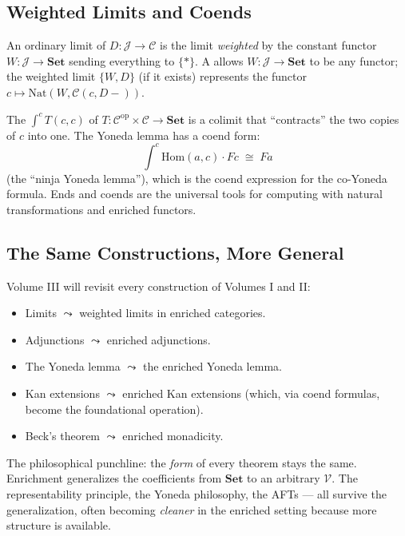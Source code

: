 \subsection{Weighted Limits and Coends}

An ordinary limit of $D: \mathcal{J} \to \mathcal{C}$ is the limit
\emph{weighted} by the constant functor $W: \mathcal{J} \to \mathbf{Set}$
sending everything to $\{*\}$. A  allows $W:
\mathcal{J} \to \mathbf{Set}$ to be any functor; the weighted limit
$\{W, D\}$ (if it exists) represents the functor
$c \mapsto \mathrm{Nat}(W, \mathcal{C}(c, D-))$.

The  $\int^c T(c,c)$ of $T: \mathcal{C}^{\mathrm{op}} \times
\mathcal{C} \to \mathbf{Set}$ is a colimit that ``contracts'' the two
copies of $c$ into one. The Yoneda lemma has a coend form:
\[
  \int^c \mathrm{Hom}(a, c) \cdot Fc \;\cong\; Fa
\]
(the ``ninja Yoneda lemma''), which is the coend expression for the
co-Yoneda formula. Ends and coends are the universal tools for computing
with natural transformations and enriched functors.

\subsection{The Same Constructions, More General}

Volume III will revisit every construction of Volumes I and II:
\begin{itemize}
  \item Limits $\leadsto$ weighted limits in enriched categories.
  \item Adjunctions $\leadsto$ enriched adjunctions.
  \item The Yoneda lemma $\leadsto$ the enriched Yoneda lemma.
  \item Kan extensions $\leadsto$ enriched Kan extensions (which, via
        coend formulas, become the foundational operation).
  \item Beck's theorem $\leadsto$ enriched monadicity.
\end{itemize}
The philosophical punchline: the \emph{form} of every theorem stays the
same. Enrichment generalizes the coefficients from $\mathbf{Set}$ to an
arbitrary $\mathcal{V}$. The representability principle, the Yoneda
philosophy, the AFTs --- all survive the generalization, often becoming
\emph{cleaner} in the enriched setting because more structure is available.


